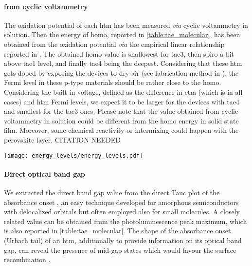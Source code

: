 	\paragraph{ from cyclic voltammetry}
	The oxidation potential of each \gls{htm} has been measured \textsl{via} cyclic voltammetry in solution.
	Then the energy of \gls{homo}, reported in \cref{table:tae_molecular}, has been obtained from the oxidation potential \textsl{via} the empirical linear relationship reported in .
	The obtained \gls{homo} value is shallowest for \gls{tae3}, then \gls{spiro} a bit above \gls{tae1} level, and finally \gls{tae4} being the deepest.
	Considering that these \gls{htm} gets doped by exposing the devices to dry air (see fabrication method in ), the Fermi level in these p-type materials should be rather close to the \gls{homo}.
	Considering the built-in voltage, defined as the difference in \gls{etm} (which is  in all cases) and \gls{htm} Fermi levels, we expect it to be larger for the devices with \gls{tae4} and smallest for the \gls{tae3} ones.
	Please note that the value obtained from cyclic voltammetry in solution could be different from the \gls{homo} energy in solid state film.
	Moreover, some chemical reactivity or intermixing could happen with the perovskite layer. CITATION NEEDED

	\begin{SCfigure}
		\centering
		\texttt{[image: energy\_levels/energy\_levels.pdf]}
		\label{fig:tae-energy_levels}
	\end{SCfigure}

	\paragraph{Direct optical band gap}
	We extracted the direct band gap value from the direct Tauc plot of the absorbance onset \cite{WikipediaTauc}, an easy technique developed for amorphous semiconductors \cite{Stenzel2005} with delocalized orbitals but often employed also for small molecules.
	A closely related value can be obtained from the photoluminescence peak maximum, which is also reported in \cref{table:tae_molecular}.
	The shape of the absorbance onset (Urbach tail) of an \gls{htm}, additionally to provide information on its optical band gap, can reveal the presence of mid-gap states which would favour the surface recombination \cite{Tvingstedt2017}.

